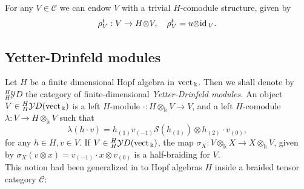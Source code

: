 \documentclass[11pt]{amsart}
\newcommand{\otk}{{\otimes_{\ku}}}
\newcommand{\ot}{{\otimes}}
\newcommand{\Sc}{{\mathcal S}}
\newcommand{\vc}{{\mathcal C}}
\newcommand{\YD}{{\mathcal YD}}
\newcommand{\ku}{{\Bbbk}}
\newcommand{\id}{\mbox{\rm id\,}}
\newcommand{\vect}{\mbox{\rm vect\,}}
\renewcommand{\_}[1]{\mbox{$_{\left( #1 \right)}$}}
\theoremstyle{plain}
\numberwithin{equation}{section}
\theoremstyle{definition}
\theoremstyle{remark}
\theoremstyle{introTheorems}
\begin{document}
\medbreak

For any $V\in \vc$ we can endow $V$ with a trivial $H$-comodule structure, given by
$$\rho^t_V:V\to H\ot V, \quad \rho^t_V=u\ot \id_V.$$



\subsection{Yetter-Drinfeld modules}\label{Section_YD}

Let $H$ be a finite dimensional Hopf algebra in $\vect_\ku$. Then we shall denote by ${}^H_H\YD$ the category of finite-dimensional \textit{Yetter-Drinfeld modules.}  An object $V\in {}^H_H\YD(\vect_\ku)$ is a left $H$-module $\cdot:H\otk V\to V$, and a left $H$-comodule $\lambda:V\to H\otk V$ such that
\begin{equation}\label{yd-module} \lambda(h\cdot v)=h\_1 v\_{-1} \Sc(h\_3)\ot h\_2\cdot v\_0,
\end{equation}
for any $h\in H, v\in V$.  If $V\in {}^H_H\YD(\vect_\ku)$, the map
$\sigma_X: V\otk X\to X\otk V$, given by $\sigma_X(v\ot x)=v\_{-1}\cdot x\ot v\_0$ is a half-braiding for $V$.\\


This notion had been generalized in \cite{Besp95} to Hopf algebras $H$ inside a braided tensor category $\vc$:
\end{document}
